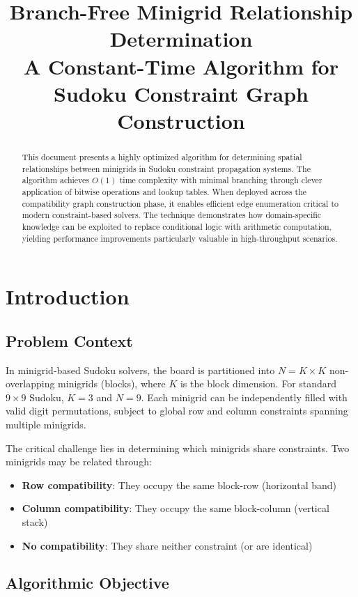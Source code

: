 \documentclass[11pt,a4paper]{article}
\title{\textbf{Branch-Free Minigrid Relationship Determination}\\
\large A Constant-Time Algorithm for Sudoku Constraint Graph Construction}
\author{}
\date{}
\begin{document}
\maketitle

\begin{abstract}
This document presents a highly optimized algorithm for determining spatial relationships between minigrids in Sudoku constraint propagation systems. The algorithm achieves $O(1)$ time complexity with minimal branching through clever application of bitwise operations and lookup tables. When deployed across the compatibility graph construction phase, it enables efficient edge enumeration critical to modern constraint-based solvers. The technique demonstrates how domain-specific knowledge can be exploited to replace conditional logic with arithmetic computation, yielding performance improvements particularly valuable in high-throughput scenarios.
\end{abstract}

\section{Introduction}

\subsection{Problem Context}

In minigrid-based Sudoku solvers, the board is partitioned into $N = K \times K$ non-overlapping minigrids (blocks), where $K$ is the block dimension. For standard $9 \times 9$ Sudoku, $K = 3$ and $N = 9$. Each minigrid can be independently filled with valid digit permutations, subject to global row and column constraints spanning multiple minigrids.

The critical challenge lies in determining which minigrids share constraints. Two minigrids may be related through:
\begin{itemize}
    \item \textbf{Row compatibility}: They occupy the same block-row (horizontal band)
    \item \textbf{Column compatibility}: They occupy the same block-column (vertical stack)
    \item \textbf{No compatibility}: They share neither constraint (or are identical)
\end{itemize}

\subsection{Algorithmic Objective}
\end{document}

